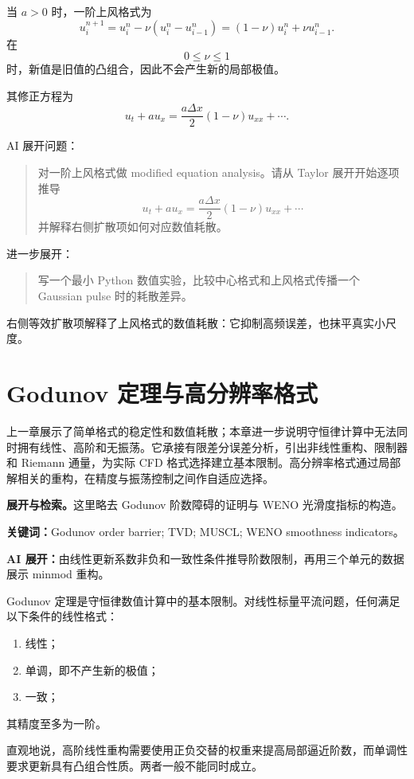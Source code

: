 \documentclass[11pt,openany]{ctexbook}
\newcommand{\studyroute}[3]{%
  \par\smallskip\noindent\textbf{展开与检索。}#1\par
  \noindent\textbf{关键词：}#2。\par
  \noindent\textbf{AI 展开：}#3\par
}
\begin{document}
当 \(a>0\) 时，一阶上风格式为
\[
u_i^{n+1}
=
u_i^n-\nu(u_i^n-u_{i-1}^n)
=
(1-\nu)u_i^n+\nu u_{i-1}^n.
\]
在
\[
0\le\nu\le1
\]
时，新值是旧值的凸组合，因此不会产生新的局部极值。

其修正方程为
\[
u_t+au_x
=
\frac{a\Delta x}{2}(1-\nu)u_{xx}
+\cdots.
\]

\begin{askai}
AI 展开问题：
\begin{quote}
对一阶上风格式做 modified equation analysis。请从 Taylor 展开开始逐项推导
\[
u_t+au_x=\frac{a\Delta x}{2}(1-\nu)u_{xx}+\cdots
\]
并解释右侧扩散项如何对应数值耗散。
\end{quote}

进一步展开：
\begin{quote}
写一个最小 Python 数值实验，比较中心格式和上风格式传播一个 Gaussian pulse 时的耗散差异。
\end{quote}
\end{askai}

右侧等效扩散项解释了上风格式的数值耗散：它抑制高频误差，也抹平真实小尺度。

\chapter{Godunov 定理与高分辨率格式}

\begin{chaptersummary}
上一章展示了简单格式的稳定性和数值耗散；本章进一步说明守恒律计算中无法同时拥有线性、高阶和无振荡。它承接有限差分误差分析，引出非线性重构、限制器和 Riemann 通量，为实际 CFD 格式选择建立基本限制。高分辨率格式通过局部解相关的重构，在精度与振荡控制之间作自适应选择。
\end{chaptersummary}
\studyroute{这里略去 Godunov 阶数障碍的证明与 WENO 光滑度指标的构造。}{Godunov order barrier; TVD; MUSCL; WENO smoothness indicators}{由线性更新系数非负和一致性条件推导阶数限制，再用三个单元的数据展示 minmod 重构。}

Godunov 定理是守恒律数值计算中的基本限制。对线性标量平流问题，任何满足以下条件的线性格式：

\begin{enumerate}
  \item 线性；
  \item 单调，即不产生新的极值；
  \item 一致；
\end{enumerate}

其精度至多为一阶。

直观地说，高阶线性重构需要使用正负交替的权重来提高局部逼近阶数，而单调性要求更新具有凸组合性质。两者一般不能同时成立。
\end{document}
